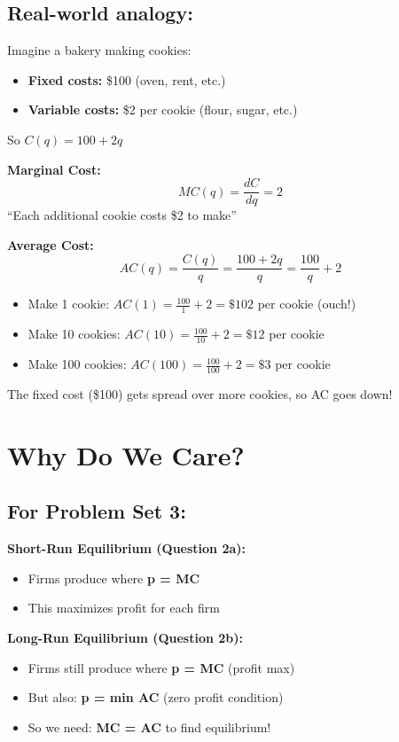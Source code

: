 \documentclass[11pt]{article}
\begin{document}
\subsection*{Real-world analogy:}

Imagine a bakery making cookies:

\begin{itemize}[leftmargin=*]
    \item \textbf{Fixed costs:} \$100 (oven, rent, etc.)
    \item \textbf{Variable costs:} \$2 per cookie (flour, sugar, etc.)
\end{itemize}

So $C(q) = 100 + 2q$

\textbf{Marginal Cost:}
\[
MC(q) = \frac{dC}{dq} = 2
\]
``Each additional cookie costs \$2 to make''

\textbf{Average Cost:}
\[
AC(q) = \frac{C(q)}{q} = \frac{100 + 2q}{q} = \frac{100}{q} + 2
\]

\begin{itemize}[leftmargin=*]
    \item Make 1 cookie: $AC(1) = \frac{100}{1} + 2 = \$102$ per cookie (ouch!)
    \item Make 10 cookies: $AC(10) = \frac{100}{10} + 2 = \$12$ per cookie
    \item Make 100 cookies: $AC(100) = \frac{100}{100} + 2 = \$3$ per cookie
\end{itemize}

The fixed cost (\$100) gets spread over more cookies, so AC goes down!

\newpage

\section{Why Do We Care?}

\subsection*{For Problem Set 3:}

\textbf{Short-Run Equilibrium (Question 2a):}
\begin{itemize}[leftmargin=*]
    \item Firms produce where \textbf{p = MC}
    \item This maximizes profit for each firm
\end{itemize}

\textbf{Long-Run Equilibrium (Question 2b):}
\begin{itemize}[leftmargin=*]
    \item Firms still produce where \textbf{p = MC} (profit max)
    \item But also: \textbf{p = min AC} (zero profit condition)
    \item So we need: \textbf{MC = AC} to find equilibrium!
\end{itemize}
\end{document}

